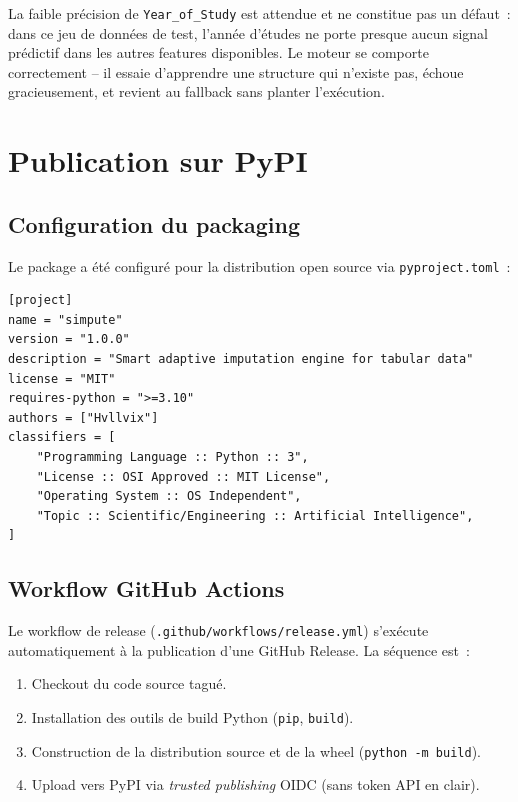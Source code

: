 \documentclass[12pt,a4paper]{report}
\begin{document}
La faible précision de \texttt{Year\_of\_Study} est attendue et ne constitue pas un défaut~: dans ce jeu de données de test, l'année d'études ne porte presque aucun signal prédictif dans les autres features disponibles. Le moteur se comporte correctement -- il essaie d'apprendre une structure qui n'existe pas, échoue gracieusement, et revient au fallback sans planter l'exécution.

\section{Publication sur PyPI}

\subsection{Configuration du packaging}

Le package a été configuré pour la distribution open source via \texttt{pyproject.toml}~:

\begin{lstlisting}[caption={Configuration du packaging Simpute (pyproject.toml)}]
[project]
name = "simpute"
version = "1.0.0"
description = "Smart adaptive imputation engine for tabular data"
license = "MIT"
requires-python = ">=3.10"
authors = ["Hvllvix"]
classifiers = [
    "Programming Language :: Python :: 3",
    "License :: OSI Approved :: MIT License",
    "Operating System :: OS Independent",
    "Topic :: Scientific/Engineering :: Artificial Intelligence",
]
\end{lstlisting}

\subsection{Workflow GitHub Actions}

Le workflow de release (\texttt{.github/workflows/release.yml}) s'exécute automatiquement à la publication d'une GitHub Release. La séquence est~:
\begin{enumerate}
  \item Checkout du code source tagué.
  \item Installation des outils de build Python (\texttt{pip}, \texttt{build}).
  \item Construction de la distribution source et de la wheel (\texttt{python -m build}).
  \item Upload vers PyPI via \textit{trusted publishing} OIDC (sans token API en clair).
\end{enumerate}
\end{document}
